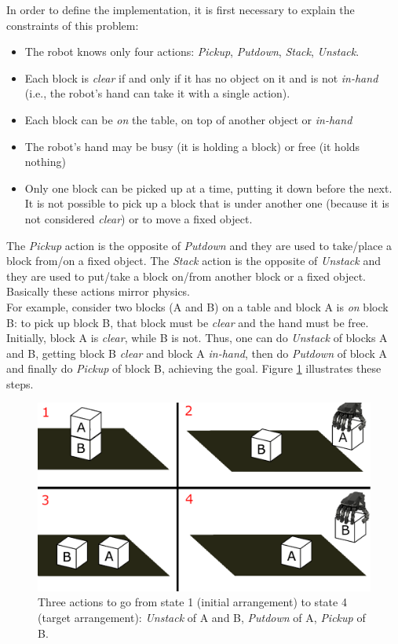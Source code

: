 In order to define the implementation, it is first necessary to explain the constraints of this problem:

\begin{itemize}
	\item The robot knows only four actions: \textit{Pickup}, \textit{Putdown}, \textit{Stack}, \textit{Unstack}.
	\item Each block is \textit{clear} if and only if it has no object on it and is not \textit{in-hand} (i.e., the robot's hand can take it with a single action).
	\item Each block can be \textit{on} the table, on top of another object or \textit{in-hand}
	\item The robot's hand may be busy (it is holding a block) or free (it holds nothing)
	\item Only one block can be picked up at a time, putting it down before the next. It is not possible to pick up a block that is under another one (because it is not considered \textit{clear}) or to move a fixed object.
\end{itemize}

The \textit{Pickup} action is the opposite of \textit{Putdown} and they are used to take/place a block from/on a fixed object. The \textit{Stack} action is the opposite of \textit{Unstack} and they are used to put/take a block on/from another block or a fixed object. \\
Basically these actions mirror physics. \\
For example, consider two blocks (A and B) on a table and block A is \textit{on} block B: to pick up block B, that block must be \textit{clear} and the hand must be free. Initially, block A is \textit{clear}, while B is not. Thus, one can do \textit{Unstack} of blocks A and B, getting block B \textit{clear} and block A \textit{in-hand}, then do \textit{Putdown} of block A and finally do \textit{Pickup} of block B, achieving the goal. Figure \ref{fig:blocks_example} illustrates these steps. \\

\begin{figure} [h]
\centering
\includegraphics[width=0.9
\textwidth]{figures/Magistrale/blocks_example}
\caption[Blocks world example]{Three actions to go from state 1 (initial arrangement) to state 4 (target arrangement): \textit{Unstack} of A and B, \textit{Putdown} of A, \textit{Pickup} of B. 
\label{fig:blocks_example}}
\end{figure} 

